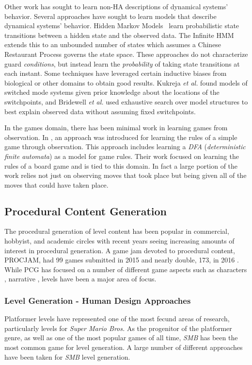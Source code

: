 \documentclass[a4paper]{article}
\begin{document}
Other work has sought to learn non-HA descriptions of dynamical systems' behavior. 
Several approaches have sought to learn models that describe dynamical systems' behavior.
Hidden Markov Models~\cite{baum1966statistical} learn probabilistic state transitions between a hidden state and the observed data.
The Infinite HMM ~\cite{beal2002infinite} extends this to an unbounded number of states which assumes a Chinese Restaurant Process governs the state space.
These approaches do not characterize guard \textit{conditions}, but instead learn the \textit{probability} of taking state transitions at each instant. 
Some techniques have leveraged certain inductive biases from biological or other domains to obtain good results.
Kukreja \textit{et al.}\cite{kukreja2005least} found models of switched mode systems given prior knowledge about the locations of the switchpoints, and Bridewell \textit{et al.}\cite{bridewell2008inductive} used exhaustive search over model structures to best explain observed data without assuming fixed switchpoints.

In the games domain, there has been minimal work in learning games from observation. In  \cite{bjornsson2012learning}, an approach was introduced for learning the rules of a simple game through observation. This approach includes learning a \textit{DFA} (\textit{deterministic finite automata}) as a model for game rules. Their work focused on learning the rules of a board game and is tied to this domain.  In fact a large portion of the work relies not just on observing moves that took place but being given all of the moves that could have taken place.

\subsection{Procedural Content Generation}


The procedural generation of level content has been popular in commercial, hobbyist, and academic circles with recent years seeing increasing amounts of interest in procedural generation.   A game jam devoted to procedural content, PROCJAM, had 99 games submitted in 2015 and nearly double, 173, in 2016 \cite{PROCJAM2015,PROCJAM2016}.  While PCG has focused on a number of different game aspects such as characters \cite{SOMETHING}, narrative \cite{SOMETHING}, levels have been a major area of focus.   

\subsubsection{Level Generation - Human Design Approaches}
Platformer levels have represented one of the most fecund areas of research, particularly levels for \textit{Super Mario Bros.}  As the progenitor of the platformer genre, as well as one of the most popular games of all time, \textit{SMB} has been the most common game for level generation.  A large number of different approaches have been taken for \textit{SMB} level generation.
\end{document}
